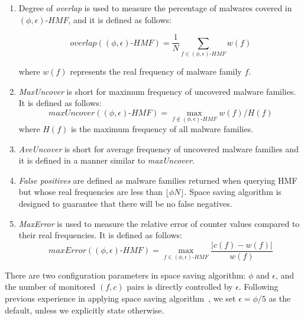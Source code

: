\begin{enumerate}

\item 
Degree of \textit{overlap} is used to measure the percentage of malwares covered in $(\phi, \epsilon)\mbox{-}HMF$,
and it is defined as follows:

\begingroup\makeatletter{}\check@mathfonts
$$overlap((\phi, \epsilon)\mbox{-}HMF) = \dfrac{1}{N}\sum_{f \in (\phi, \epsilon)\mbox{-}HMF}w(f)$$
\endgroup

where $w(f)$ represents the real frequency of malware family $f$.  

\item 
\textit{MaxUncover} is short for maximum frequency of uncovered malware families. 
It is defined as follows:
\begingroup\makeatletter\def\f@size{8}\check@mathfonts
$$maxUncover((\phi, \epsilon)\mbox{-}HMF) = \max_{f \notin (\phi, \epsilon)\mbox{-}HMF}w(f)/H(f)$$
\endgroup
where $H(f)$ is the maximum frequency of all malware families. 

\item 
\textit{AveUncover} is short for average frequency of uncovered malware families 
and it is defined in a manner similar to \textit{maxUncover}. 

\item 
\textit{False positives} are defined as malware families returned when querying HMF
but whose real frequencies are less than $\lfloor \phi N \rfloor$. 
Space saving algorithm is designed to guarantee that there will be no false negatives. 

\item 
\textit{MaxError} is used to measure the relative error of counter values
compared to their real frequencies.
It is defined as follows:
\begingroup\makeatletter\def\f@size{8}\check@mathfonts
$$maxError((\phi, \epsilon)\mbox{-}HMF) = \max_{f \in (\phi, \epsilon)\mbox{-}HMF} \dfrac{\left|c(f) - w(f)\right|}{w(f)}$$
\endgroup


\end{enumerate}

There are two configuration parameters in space saving algorithm: $\phi$ and $\epsilon$, 
and the number of monitored $(f, c)$ pairs is directly controlled by $\epsilon$. 
Following previous experience in applying space saving algorithm~\cite{hot-calling-context}, 
we set $\epsilon = \phi/5$ as the default, 
unless we explicitly state otherwise.  


